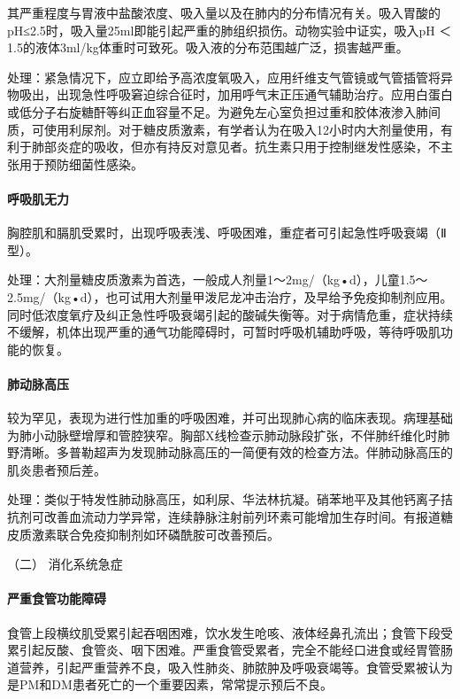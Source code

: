 其严重程度与胃液中盐酸浓度、吸入量以及在肺内的分布情况有关。吸入胃酸的pH≤2.5时，吸入量25ml即能引起严重的肺组织损伤。动物实验中证实，吸入pH
＜ 1.5的液体3ml/kg体重时可致死。吸入液的分布范围越广泛，损害越严重。

处理：紧急情况下，应立即给予高浓度氧吸入，应用纤维支气管镜或气管插管将异物吸出，出现急性呼吸窘迫综合征时，加用呼气末正压通气辅助治疗。应用白蛋白或低分子右旋糖酐等纠正血容量不足。为避免左心室负担过重和胶体液渗入肺间质，可使用利尿剂。对于糖皮质激素，有学者认为在吸入12小时内大剂量使用，有利于肺部炎症的吸收，但亦有持反对意见者。抗生素只用于控制继发性感染，不主张用于预防细菌性感染。

\paragraph{呼吸肌无力}

胸腔肌和膈肌受累时，出现呼吸表浅、呼吸困难，重症者可引起急性呼吸衰竭（Ⅱ型）。

处理：大剂量糖皮质激素为首选，一般成人剂量1～2mg/（kg•d），儿童1.5～2.5mg/（kg•d），也可试用大剂量甲泼尼龙冲击治疗，及早给予免疫抑制剂应用。同时低浓度氧疗及纠正急性呼吸衰竭引起的酸碱失衡等。对于病情危重，症状持续不缓解，机体出现严重的通气功能障碍时，可暂时呼吸机辅助呼吸，等待呼吸肌功能的恢复。

\paragraph{肺动脉高压}

较为罕见，表现为进行性加重的呼吸困难，并可出现肺心病的临床表现。病理基础为肺小动脉壁增厚和管腔狭窄。胸部X线检查示肺动脉段扩张，不伴肺纤维化时肺野清晰。多普勒超声为发现肺动脉高压的一简便有效的检查方法。伴肺动脉高压的肌炎患者预后差。

处理：类似于特发性肺动脉高压，如利尿、华法林抗凝。硝苯地平及其他钙离子拮抗剂可改善血流动力学异常，连续静脉注射前列环素可能增加生存时间。有报道糖皮质激素联合免疫抑制剂如环磷酰胺可改善预后。

\hypertarget{text00350.htmlux5cux23CHP14-3-3-4-2}{}
（二） 消化系统急症

\paragraph{严重食管功能障碍}

食管上段横纹肌受累引起吞咽困难，饮水发生呛咳、液体经鼻孔流出；食管下段受累引起反酸、食管炎、咽下困难。严重食管受累者，完全不能经口进食或经胃管肠道营养，引起严重营养不良，吸入性肺炎、肺脓肿及呼吸衰竭等。食管受累被认为是PM和DM患者死亡的一个重要因素，常常提示预后不良。

